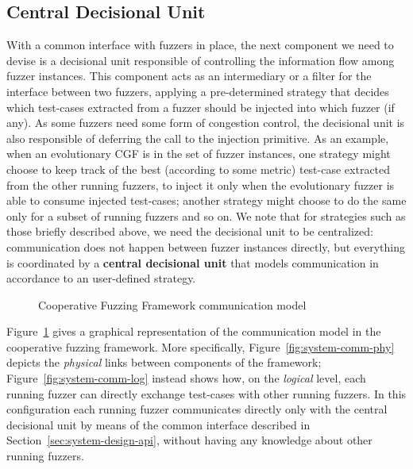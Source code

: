 \subsection{Central Decisional Unit}
With a common interface with fuzzers in place, the next component we need to
devise is a decisional unit responsible of controlling the information flow
among fuzzer instances. This component acts as an intermediary or a filter for
the interface between two fuzzers, applying a pre-determined strategy that
decides which test-cases extracted from a fuzzer should be injected into which
fuzzer (if any). As some fuzzers need some form of congestion control, the
decisional unit is also responsible of deferring the call to the injection
primitive. As an example, when an evolutionary \ac{CGF} is in the set of fuzzer
instances, one strategy might choose to keep track of the best (according to
some metric) test-case extracted from the other running fuzzers, to inject it
only when the evolutionary fuzzer is able to consume injected test-cases;
another strategy might choose to do the same only for a subset of running
fuzzers and so on. We note that for strategies such as those briefly described
above, we need the decisional unit to be centralized: communication does not
happen between fuzzer instances directly, but everything is coordinated by a
\textbf{central decisional unit} that models communication in accordance to an
user-defined strategy.

\begin{figure}
    \centering
    \qquad
\caption{Cooperative Fuzzing Framework communication model}
\label{fig:system-comm}
\end{figure}

Figure~\ref{fig:system-comm} gives a graphical representation of the
communication model in the cooperative fuzzing framework. More specifically,
Figure~\ref{fig:system-comm-phy} depicts the \emph{physical} links between
components of the framework; Figure~\ref{fig:system-comm-log} instead shows how,
on the \emph{logical} level, each running fuzzer can directly exchange
test-cases with other running fuzzers. In this configuration each running fuzzer
communicates directly only with the central decisional unit by means of the
common interface described in Section~\ref{sec:system-design-api}, without
having any knowledge about other running fuzzers.

